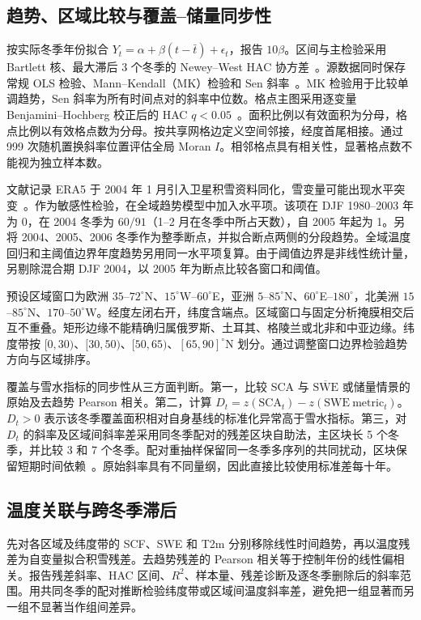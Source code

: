 \subsection{趋势、区域比较与覆盖--储量同步性}

按实际冬季年份拟合 $Y_t=\alpha+\beta(t-\bar t)+\epsilon_t$，报告 $10\beta$。区间与主检验采用 Bartlett 核、最大滞后 3 个冬季的 Newey--West HAC 协方差~\cite{newey1987}。源数据同时保存常规 OLS 检验、Mann--Kendall（MK）检验和 Sen 斜率~\cite{mann1945,sen1968}。MK 检验用于比较单调趋势，Sen 斜率为所有时间点对的斜率中位数。格点主图采用逐变量 Benjamini--Hochberg 校正后的 HAC $q<0.05$~\cite{bh1995}。面积比例以有效面积为分母，格点比例以有效格点数为分母。按共享网格边定义空间邻接，经度首尾相接。通过 999 次随机置换斜率位置评估全局 Moran $I$。相邻格点具有相关性，显著格点数不能视为独立样本数。

文献记录 ERA5 于 2004 年 1 月引入卫星积雪资料同化，雪变量可能出现水平突变~\cite{mortimer2020,urraca2023}。作为敏感性检验，在全域趋势模型中加入水平项。该项在 DJF 1980--2003 年为 0，在 2004 冬季为 $60/91$（1--2 月在冬季中所占天数），自 2005 年起为 1。另将 2004、2005、2006 冬季作为整季断点，并拟合断点两侧的分段趋势。全域温度回归和主阈值边界年度趋势另用同一水平项复算。由于阈值边界是非线性统计量，另剔除混合期 DJF 2004，以 2005 年为断点比较各窗口和阈值。

预设区域窗口为欧洲 $35$--$72^\circ$N、$15^\circ$W--$60^\circ$E，亚洲 $5$--$85^\circ$N、$60^\circ$E--$180^\circ$，北美洲 $15$--$85^\circ$N、$170$--$50^\circ$W。经度左闭右开，纬度含端点。区域窗口与固定分析掩膜相交后互不重叠。矩形边缘不能精确归属俄罗斯、土耳其、格陵兰或北非和中亚边缘。纬度带按 $[0,30)$、$[30,50)$、$[50,65)$、$[65,90]^\circ$N 划分。通过调整窗口边界检验趋势方向与区域排序。

覆盖与雪水指标的同步性从三方面判断。第一，比较 SCA 与 $\overline{\mathrm{SWE}}$ 或储量情景的原始及去趋势 Pearson 相关。第二，计算 $D_t=z(\mathrm{SCA}_t)-z(\mathrm{SWE\ metric}_t)$。$D_t>0$ 表示该冬季覆盖面积相对自身基线的标准化异常高于雪水指标。第三，对 $D_t$ 的斜率及区域间斜率差采用同冬季配对的残差区块自助法，主区块长 5 个冬季，并比较 3 和 7 个冬季。配对重抽样保留同一冬季多序列的共同扰动，区块保留短期时间依赖~\cite{kunsch1989}。原始斜率具有不同量纲，因此直接比较使用标准差每十年。

\subsection{温度关联与跨冬季滞后}

先对各区域及纬度带的 SCF、SWE 和 T2m 分别移除线性时间趋势，再以温度残差为自变量拟合积雪残差。去趋势残差的 Pearson 相关等于控制年份的线性偏相关。报告残差斜率、HAC 区间、$R^2$、样本量、残差诊断及逐冬季删除后的斜率范围。用共同冬季的配对推断检验纬度带或区域间温度斜率差，避免把一组显著而另一组不显著当作组间差异。

